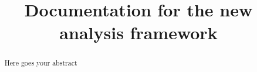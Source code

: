 \documentclass[ALICE,manyauthors]{ALICE_analysis_notes}
\begin{document}
%

\linenumbers

%
%
\begin{titlepage}
%
\PHdate{\today}
%
\title{Documentation for the new analysis framework}
%
\author{}
%
%
\begin{abstract}
Here goes your abstract
\end{abstract}
\end{titlepage}
\setcounter{page}{2}
%
\clearpage
{}
\tableofcontents
\clearpage
 
\clearpage


\end{document}
